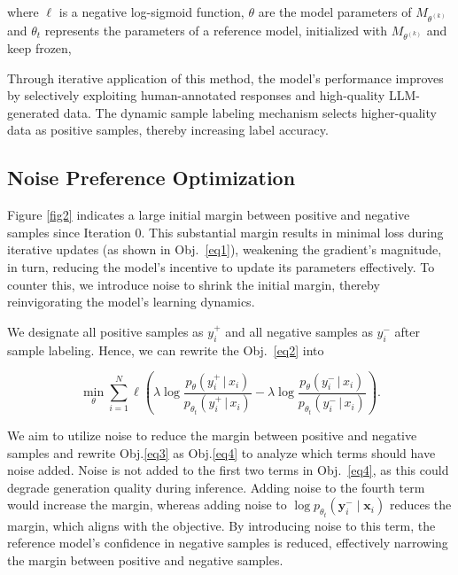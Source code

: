 where $\ell$ is a negative log-sigmoid function, \( \theta \) are the model parameters of \( M_{\theta^{(k)}} \) and \( \theta_t \) represents the parameters of a reference model, initialized with \( M_{\theta^{(k)}} \) and keep frozen,


Through iterative application of this method, the model's performance improves by selectively exploiting human-annotated responses and high-quality LLM-generated data. The dynamic sample labeling mechanism selects higher-quality data as positive samples, thereby increasing label accuracy.



\subsection{Noise Preference Optimization}
Figure \ref{fig2} indicates a large initial margin between positive and negative samples since Iteration 0. This substantial margin results in minimal loss during iterative updates (as shown in Obj.~\ref{eq1}), weakening the gradient's magnitude, in turn, reducing the model's incentive to update its parameters effectively. To counter this, we introduce noise to shrink the initial margin, thereby reinvigorating the model's learning dynamics.



We designate all positive samples as $y_i^+$ and all negative samples as $y_i^-$ after sample labeling. Hence, we can rewrite the Obj.~\ref{eq2} into

\begin{equation}
\label{eq3}
\min_{\theta} \sum_{i=1}^N \ell \left( \lambda \log \frac{p_{\theta}(y^+_i \,|\, x_i)}{p_{\theta_t}(y^+_i \,|\, x_i)} - \lambda \log \frac{p_{\theta}(y^-_i \,|\, x_i)}{p_{\theta_t}(y^-_i \,|\, x_i)} \right).
\end{equation}


We aim to utilize noise to reduce the margin between positive and negative samples and rewrite Obj.\ref{eq3} as Obj.\ref{eq4} to analyze which terms should have noise added. Noise is not added to the first two terms in Obj.~\ref{eq4}, as this could degrade generation quality during inference. Adding noise to the fourth term would increase the margin, whereas adding noise to $\log p_{\theta_t}(\mathbf{y}_i^- \mid \mathbf{x}_i)$ reduces the margin, which aligns with the objective. By introducing noise to this term, the reference model's confidence in negative samples is reduced, effectively narrowing the margin between positive and negative samples.



